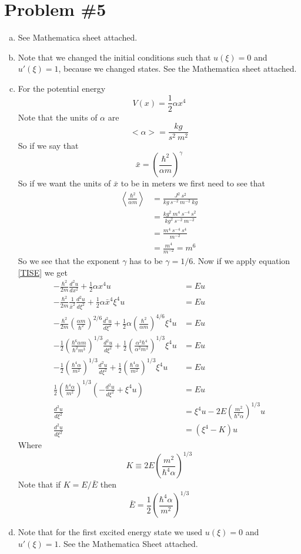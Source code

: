 \documentclass[11pt]{article}
\numberwithin{equation}{section}
\begin{document}
\section{Problem \#5}
\begin{enumerate}[(a)]
\item
See Mathematica sheet attached.

\item
Note that we changed the initial conditions such that $u(\xi) = 0$ and $u'(\xi) = 1$, because we changed states. See the Mathematica sheet attached.

\item
For the potential energy
$$V(x) = \frac{1}{2}\alpha x^4$$
Note that the units of $\alpha$ are
$$<\alpha> = \frac{kg}{s^2\ m^2}$$
So if we say that
$$\bar{x} = \left(\frac{\hbar^2}{\alpha m}\right)^{\gamma}$$
So if we want the units of $\bar{x}$ to be in meters we first need to see that
\begin{align*}
\left<\frac{\hbar^2}{\alpha m}\right> &= \frac{J^2\ s^2}{kg\ s^{-2}\ m^{-2}\ kg}\\
&= \frac{kg^2\ m^{4}\ s^{-4}\ s^2}{kg^2\ s^{-2}\ m^{-2}}\\
&= \frac{m^{4}\ s^{-4}\ s^4}{m^{-2}}\\
&= \frac{m^{4}}{m^{-2}} = m^6
\end{align*}
So we see that the exponent $\gamma$ has to be $\gamma = 1/6$. Now if we apply equation \ref{TISE} we get
\begin{align*}
-\frac{\hbar^2}{2m}\frac{d^2u}{dx^2}+\frac{1}{2}\alpha x^4u &= Eu\\
-\frac{\hbar^2}{2m}\frac{1}{\bar{x}^2}\frac{d^2u}{d\xi^2}+\frac{1}{2}\alpha\bar{x}^4\xi^4u &= Eu\\
-\frac{\hbar^2}{2m}\left(\frac{\alpha m}{\hbar^2}\right)^{2/6}\frac{d^2u}{d\xi^2}+\frac{1}{2}\alpha\left(\frac{\hbar^2}{\alpha m}\right)^{4/6}\xi^4u &= Eu\\
-\frac{1}{2}\left(\frac{\hbar^6\alpha m}{\hbar^2 m^3}\right)^{1/3}\frac{d^2u}{d\xi^2}+\frac{1}{2}\left(\frac{\alpha^3\hbar^4}{\alpha^2 m^2}\right)^{1/3}\xi^4u &= Eu\\
-\frac{1}{2}\left(\frac{\hbar^4\alpha}{m^2}\right)^{1/3}\frac{d^2u}{d\xi^2}+\frac{1}{2}\left(\frac{\hbar^4\alpha}{m^2}\right)^{1/3}\xi^4u &= Eu\\
\frac{1}{2}\left(\frac{\hbar^4\alpha}{m^2}\right)^{1/3}\left(-\frac{d^2u}{d\xi^2}+\xi^4u\right) &= Eu\\
\frac{d^2u}{d\xi^2} &= \xi^4u - 2E\left(\frac{m^2}{\hbar^4\alpha}\right)^{1/3}u\\
\frac{d^2u}{d\xi^2} &= (\xi^4-K)u
\end{align*}
Where 
$$K\equiv2E\left(\frac{m^2}{\hbar^4\alpha}\right)^{1/3}$$
Note that if $K=E/\bar{E}$ then 
$$\bar{E} = \frac{1}{2}\left(\frac{\hbar^4\alpha}{m^2}\right)^{1/3}$$

\item
Note that for the first excited energy state we used $u(\xi) = 0$ and $u'(\xi)=1$. See the Mathematica Sheet attached.
\end{enumerate}
\end{document}
